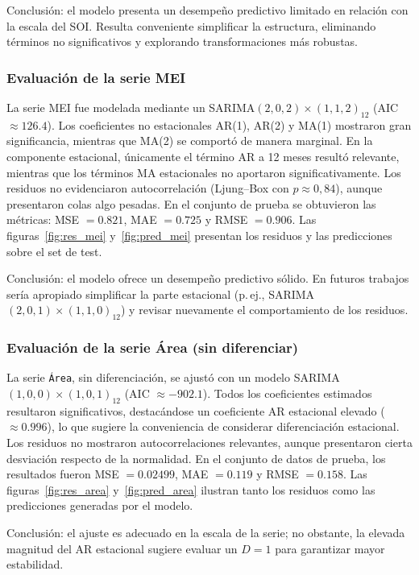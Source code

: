 Conclusión: el modelo presenta un desempeño predictivo limitado en relación con la escala del SOI. Resulta conveniente simplificar la estructura, eliminando términos no significativos y explorando transformaciones más robustas.  
\vspace{0.3em}


\subsubsection{Evaluación de la serie MEI}
La serie MEI fue modelada mediante un SARIMA$(2,0,2)\times(1,1,2)_{12}$ (AIC $\approx 126.4$). 
Los coeficientes no estacionales AR(1), AR(2) y MA(1) mostraron gran significancia, mientras que MA(2) se comportó de manera marginal. En la componente estacional, únicamente el término AR a 12 meses resultó relevante, mientras que los términos MA estacionales no aportaron significativamente. Los residuos no evidenciaron autocorrelación (Ljung--Box con $p\approx 0,84$), aunque presentaron colas algo pesadas.  
En el conjunto de prueba se obtuvieron las métricas: MSE $=0.821$, MAE $=0.725$ y RMSE $=0.906$. Las figuras~\ref{fig:res_mei} y~\ref{fig:pred_mei} presentan los residuos y las predicciones sobre el set de test.  

Conclusión: el modelo ofrece un desempeño predictivo sólido. En futuros trabajos sería apropiado simplificar la parte estacional (p.\,ej., SARIMA$(2,0,1)\times(1,1,0)_{12}$) y revisar nuevamente el comportamiento de los residuos.  
\vspace{0.3em}


\subsubsection{Evaluación de la serie Área (sin diferenciar)}
La serie \texttt{Área}, sin diferenciación, se ajustó con un modelo SARIMA$(1,0,0)\times(1,0,1)_{12}$ (AIC $\approx -902.1$). 
Todos los coeficientes estimados resultaron significativos, destacándose un coeficiente AR estacional elevado ($\approx 0.996$), lo que sugiere la conveniencia de considerar diferenciación estacional. Los residuos no mostraron autocorrelaciones relevantes, aunque presentaron cierta desviación respecto de la normalidad.  
En el conjunto de datos de prueba, los resultados fueron MSE $=0.02499$, MAE $=0.119$ y RMSE $=0.158$. Las figuras~\ref{fig:res_area} y~\ref{fig:pred_area} ilustran tanto los residuos como las predicciones generadas por el modelo.  

Conclusión: el ajuste es adecuado en la escala de la serie; no obstante, la elevada magnitud del AR estacional sugiere evaluar un $D=1$ para garantizar mayor estabilidad.  
\vspace{0.3em}



